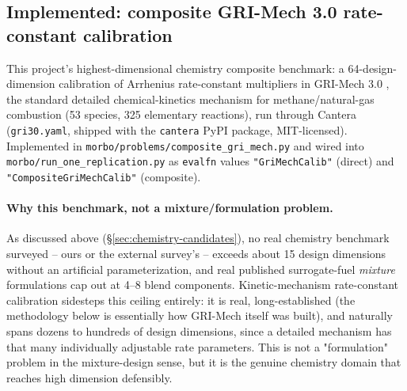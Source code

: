 \documentclass[11pt]{article}
\begin{document}
\subsection{Implemented: composite GRI-Mech 3.0 rate-constant calibration}
\label{sec:gri-mech}

This project's highest-dimensional chemistry composite benchmark: a
64-design-dimension calibration of Arrhenius rate-constant multipliers
in GRI-Mech 3.0 \citep{smith1999grimech}, the standard detailed
chemical-kinetics mechanism for methane/natural-gas combustion (53
species, 325 elementary reactions), run through Cantera
\citep{goodwin2024cantera} (\texttt{gri30.yaml}, shipped with the
\texttt{cantera} PyPI package, MIT-licensed). Implemented in
\texttt{morbo/\allowbreak problems/\allowbreak composite\_gri\_mech.py} and wired into
\texttt{morbo/\allowbreak run\_one\_replication.py} as \texttt{evalfn} values
\texttt{"GriMechCalib"} (direct) and \texttt{"CompositeGriMechCalib"}
(composite).

\paragraph{Why this benchmark, not a mixture/formulation problem.} As
discussed above (\S\ref{sec:chemistry-candidates}), no real chemistry
benchmark surveyed -- ours or the external survey's
\citep{sahas266mixturebench} -- exceeds about 15 design dimensions
without an artificial parameterization, and real published
surrogate-fuel \emph{mixture} formulations cap out at 4--8 blend
components. Kinetic-mechanism rate-constant calibration sidesteps this
ceiling entirely: it is real, long-established (the methodology below is
essentially how GRI-Mech itself was built), and naturally spans
dozens to hundreds of design dimensions, since a detailed mechanism has
that many individually adjustable rate parameters. This is not a
"formulation" problem in the mixture-design sense, but it is the
genuine chemistry domain that reaches high dimension defensibly.
\end{document}

